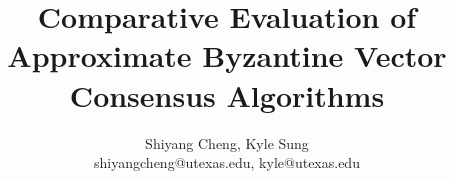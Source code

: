 \documentclass[conference]{IEEEtran}
\begin{document}
\title{Comparative Evaluation of Approximate Byzantine Vector Consensus Algorithms}
\author{Shiyang Cheng, Kyle Sung\\ shiyangcheng@utexas.edu, kyle@utexas.edu}

\maketitle
















\small

\end{document}
